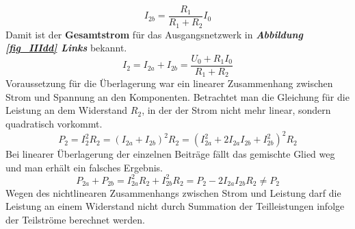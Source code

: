 \begin{equation} 
\boxed{I_{2b}=\dfrac{R_1}{R_1+R_2}I_0}
\end{equation} 
Damit ist der \textbf{Gesamtstrom} für das Ausgangsnetzwerk in \textbf{\textit{Abbildung \ref{fig_IIIdd} Links}} bekannt.
\begin{equation}
\boxed{I_2=I_{2a}+I_{2b}=\dfrac{U_0+R_1I_0}{R_1+R_2}}
\end{equation}
Voraussetzung für die Überlagerung war ein linearer Zusammenhang zwischen Strom und Spannung an den Komponenten. Betrachtet man die Gleichung für die Leistung an dem Widerstand $R_2$, in der der Strom nicht mehr linear, sondern quadratisch vorkommt.
\begin{equation}  
\boxed{P_2=I_2^2R_2=\left(I_{2a}+I_{2b}\right)^2R_2=\left(I_{2a}^2+2I_{2a}I_{2b}+I_{2b}^2\right)^2R_2}
\end{equation}  
Bei linearer Überlagerung der einzelnen Beiträge fällt das gemischte Glied weg und man erhält ein falsches Ergebnis.
\begin{equation}
\boxed{P_{2a}+P_{2b}=I_{2a}^2R_2+I_{2b}^2R_2=P_2-2I_{2a}I_{2b}R_2\neq P_2}
\end{equation}
Wegen des nichtlinearen Zusammenhangs zwischen Strom und Leistung darf die Leistung an einem Widerstand nicht durch Summation der Teilleistungen infolge der Teilströme berechnet werden. 
